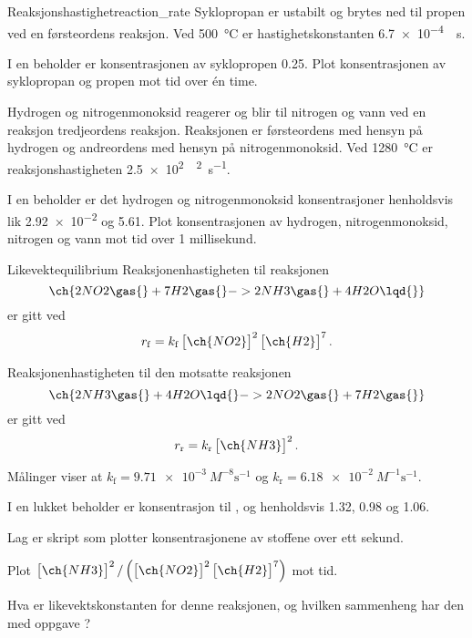 \begin{exercise}{Reaksjonshastighet}{reaction_rate}
	Syklopropan er ustabilt og brytes ned til propen ved en førsteordens reaksjon. Ved \SI{500}{\celsius} er hastighetskonstanten \SI{6,7e-4}{\per\second}.
	
	\subexercise I en beholder er konsentrasjonen av syklopropen \SI{0,25}{\molar}. Plot konsentrasjonen av syklopropan og propen mot tid over én time.
	
	Hydrogen og nitrogenmonoksid reagerer og blir til nitrogen og vann ved en reaksjon tredjeordens reaksjon. Reaksjonen er førsteordens med hensyn på hydrogen og andreordens med hensyn på nitrogenmonoksid. Ved \SI{1280}{\celsius} er reaksjonshastigheten \SI{2,5e2}{\per\molar\squared\per\second}.
	
	\subexercise I en beholder er det hydrogen og nitrogenmonoksid konsentrasjoner henholdsvis lik \SI{2,92e-2}{\molar} og \SI{5,61}{\molar}. Plot konsentrasjonen av hydrogen, nitrogenmonoksid, nitrogen og vann mot tid over 1 millisekund.
\end{exercise}

\begin{exercise}{Likevekt}{equilibrium}
	Reaksjonenhastigheten til reaksjonen
	\begin{equation*}
	\ch{2 NO2\gas{} + 7 H2\gas{} -> 2 NH3\gas{} + 4 H2O\lqd{}}
	\end{equation*}
	er gitt ved
	\begin{equation*}
	r_\mathrm{f} = k_\mathrm{f}\left[\ch{NO2}\right]^2\left[\ch{H2}\right]^7.
	\end{equation*}
	
	Reaksjonenhastigheten til den motsatte reaksjonen
	\begin{equation*}
	\ch{2 NH3\gas{} + 4 H2O\lqd{} -> 2 NO2\gas{} + 7 H2\gas{} }
	\end{equation*}
	er gitt ved
	\begin{equation*}
	r_\mathrm{r} = k_\mathrm{r}\left[\ch{NH3}\right]^2.
	\end{equation*}
	
	Målinger viser at $k_\mathrm{f}=\SI{9.71e-3}{M^{-8}\second^{-1}}$ og $k_\mathrm{r}=\SI{6.18e-2}{M^{-1}\second^{-1}}$.
	
	I en lukket beholder er konsentrasjon til ,  og  henholdsvis \SI{1,32}{\molar}, \SI{0,98}{\molar} og \SI{1,06}{\molar}.
	
	\subexercise Lag er skript som plotter konsentrasjonene av stoffene over ett sekund.
	
	\subexercise Plot $\left[\ch{NH3}\right]^2/\left( \left[\ch{NO2}\right]^2\left[\ch{H2}\right]^7\right) $ mot tid.
	
	\subexercise Hva er likevektskonstanten for denne reaksjonen, og hvilken sammenheng har den med oppgave ?
\end{exercise}

